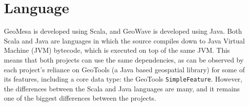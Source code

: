 \section{Language}
\label{sec:featurecompare:language}

GeoMesa is developed using Scala, and GeoWave is developed using Java.
Both Scala and Java are languages in which the source compiles down to Java Virtual Machine (JVM) bytecode, which is executed on top of the same JVM.
This means that both projects can use the same dependencies, as can be observed by each project's reliance on GeoTools (a Java based geospatial library) for some of its features, including a core data type: the GeoTools \texttt{SimpleFeature}.
However, the differences between the Scala and Java languages are many, and it remains one of the biggest differences between the projects.

